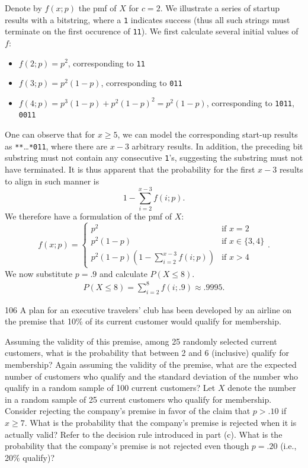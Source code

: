 \documentclass{exam}
\newcommand{\paren}[1]{\left(#1\right)}
\begin{document}
Denote by $f(x; p)$ the pmf of $X$ for $c = 2$. We illustrate a series of startup results with a bitstring, where a \verb|1| indicates success (thus all such strings must terminate on the first occurence of \verb|11|). We first calculate several initial values of $f$:
\begin{itemize}
	\item $f(2; p) = p^2$, corresponding to \verb|11|
	\item $f(3; p) = p^2(1 - p)$, corresponding to \verb|011|
	\item $f(4; p) = p^3(1 - p) + p^2(1 - p)^2 = p^2(1 - p)$, corresponding to \verb|1011|, \verb|0011|
\end{itemize}
One can observe that for $x \ge 5$, we can model the corresponding start-up results as \verb|**|\dots\verb|*011|, where there are $x - 3$ arbitrary results. In addition, the preceding bit substring must not contain any consecutive \verb|1|'s, suggesting the substring must not have terminated. It is thus apparent that the probability for the first $x - 3$ results to align in such manner is
\[
	1 - \sum_{i = 2}^{x - 3}f(i; p).
\]
We therefore have a formulation of the pmf of $X$:
\[
	f(x; p) = \begin{cases}
		p^2 & \text{if } x = 2 \\
		p^2(1 - p) & \text{if } x \in \{3, 4\} \\
		\displaystyle p^2(1 - p)\paren{1 - \sum_{i = 2}^{x - 3}f(i; p)} & \text{if } x > 4
	\end{cases}.
\]
We now substitute $p = .9$ and calculate $P(X \le 8)$.
\begin{align*}
	P(X \le 8) = \sum_{i = 2}^8 f(i; .9) \approx .9995.
\end{align*}

\begin{problem}{106}
	A plan for an executive travelers' club has been developed by an airline on the premise that 10\% of its current customer would qualify for membership.
	\begin{tasks}[label=\textbf{\alph*.}]
		\task Assuming the validity of this premise, among 25 randomly selected current customers, what is the probability that between 2 and 6 (inclusive) qualify for membership?
		\task Again assuming the validity of the premise, what are the expected number of customers who qualify and the standard deviation of the number who qualify in a random sample of 100 current customers?
		\task Let $X$ denote the number in a random sample of 25 current customers who qualify for membership. Consider rejecting the company's premise in favor of the claim that $p > .10$ if $x \ge 7$. What is the probability that the company's premise is rejected when it is actually valid?
		\task Refer to the decision rule introduced in part (c). What is the probability that the company's premise is not rejected even though $p = .20$ (i.e., 20\% qualify)?
	\end{tasks}
\end{problem}
\end{document}

